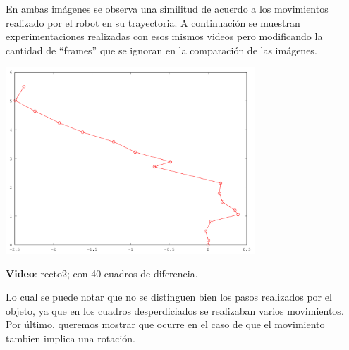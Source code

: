 \documentclass[10pt, a4paper,english,spanish,hidelinks]{article}
\begin{document}
En ambas imágenes se observa una similitud de acuerdo a los movimientos realizado por
el robot en su trayectoria. A continuación se muestran experimentaciones realizadas con
esos mismos videos pero modificando la cantidad de ``frames'' que se ignoran en la comparación
de las imágenes. 

\centerline{ }
\centerline{\includegraphics[width=0.7\textwidth]{./img/r2cant40.png}}
\centerline{\textbf{Video}: recto2; con 40 cuadros de diferencia.} 

Lo cual se puede notar que no se distinguen bien los pasos realizados por el objeto, ya
que en los cuadros desperdiciados se realizaban varios movimientos. 
Por último, queremos mostrar que ocurre en el caso de que el movimiento tambien implica una rotación.
\end{document}
